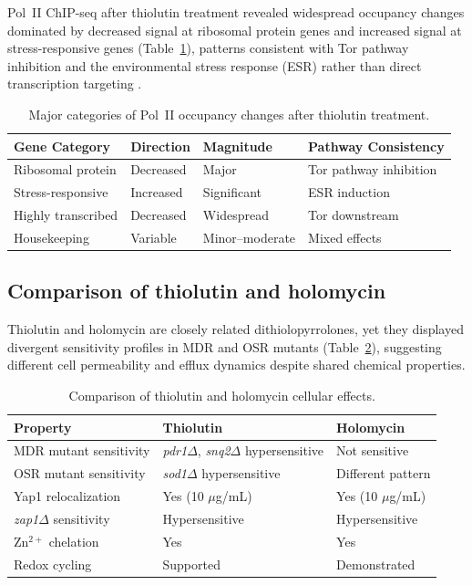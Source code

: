 \documentclass[11pt,a4paper]{article}
\begin{document}
Pol~II ChIP-seq after thiolutin treatment revealed widespread occupancy changes dominated by decreased signal at ribosomal protein genes and increased signal at stress-responsive genes (Table~\ref{tab:chipseq}), patterns consistent with Tor pathway inhibition and the environmental stress response (ESR) rather than direct transcription targeting \citep{Loewith2011, Gasch2000}.

\begin{table}[htbp]
\centering
\caption{Major categories of Pol~II occupancy changes after thiolutin treatment.}
\label{tab:chipseq}
\begin{tabular}{llll}
\toprule
\textbf{Gene Category} & \textbf{Direction} & \textbf{Magnitude} & \textbf{Pathway Consistency} \\
\midrule
Ribosomal protein & Decreased & Major & Tor pathway inhibition \\
Stress-responsive & Increased & Significant & ESR induction \\
Highly transcribed & Decreased & Widespread & Tor downstream \\
Housekeeping & Variable & Minor--moderate & Mixed effects \\
\bottomrule
\end{tabular}
\end{table}

\subsection{Comparison of thiolutin and holomycin}

Thiolutin and holomycin are closely related dithiolopyrrolones, yet they displayed divergent sensitivity profiles in MDR and OSR mutants (Table~\ref{tab:comparison}), suggesting different cell permeability and efflux dynamics despite shared chemical properties.

\begin{table}[htbp]
\centering
\caption{Comparison of thiolutin and holomycin cellular effects.}
\label{tab:comparison}
\small
\begin{tabular}{lll}
\toprule
\textbf{Property} & \textbf{Thiolutin} & \textbf{Holomycin} \\
\midrule
MDR mutant sensitivity & \textit{pdr1}$\Delta$, \textit{snq2}$\Delta$ hypersensitive & Not sensitive \\
OSR mutant sensitivity & \textit{sod1}$\Delta$ hypersensitive & Different pattern \\
Yap1 relocalization & Yes (10 $\mu$g/mL) & Yes (10 $\mu$g/mL) \\
\textit{zap1}$\Delta$ sensitivity & Hypersensitive & Hypersensitive \\
Zn$^{2+}$ chelation & Yes & Yes \\
Redox cycling & Supported & Demonstrated \\
\bottomrule
\end{tabular}
\end{table}
\end{document}
